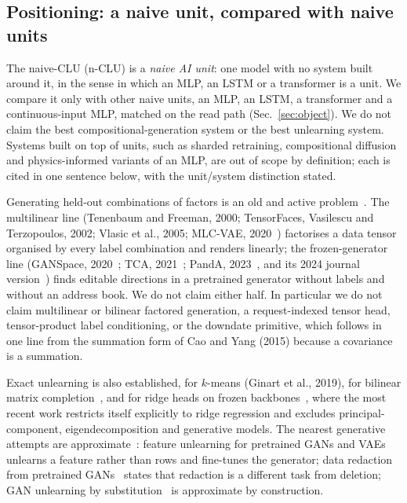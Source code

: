 \documentclass{article} %
\begin{document}
\subsection{Positioning: a naive unit, compared with naive units}
\label{sec:positioning}

The naive-CLU (n-CLU) is a \emph{naive AI unit}: one model with no system built around it, in the sense
in which an MLP, an LSTM or a transformer is a unit. We compare it only with other naive units, an
MLP, an LSTM, a transformer and a continuous-input MLP, matched on the read path
(Sec.~\ref{sec:object}). We do not claim the best compositional-generation system or the best
unlearning system. Systems built on top of units, such as sharded retraining, compositional
diffusion and physics-informed variants of an MLP, are out of scope by definition; each is cited
in one sentence below, with the unit/system distinction stated.

Generating held-out combinations of factors is an old and active problem~\citep{du2020compositional,liu2022compositional}. The multilinear
line (Tenenbaum and Freeman, 2000\nocite{tenenbaum2000separating}; TensorFaces, Vasilescu and Terzopoulos, 2002\nocite{vasilescu2002tensorfaces}; Vlasic et
al., 2005\nocite{vlasic2005face}; MLC-VAE, 2020~\citep{georgopoulos2020multilinear}) factorises a data tensor organised by every label combination and
renders linearly; the frozen-generator line (GANSpace, 2020~\citep{harkonen2020ganspace}; TCA, 2021~\citep{oldfield2021tensor}; PandA, 2023~\citep{oldfield2023panda}, and its
2024 journal version~\citep{oldfield2024bilinear}) finds editable directions in a pretrained generator without labels and
without an address book. We do not claim either half. In particular we do not claim
multilinear or bilinear factored generation, a request-indexed tensor head, tensor-product
label conditioning, or the downdate primitive, which follows in one line from the summation
form of Cao and Yang (2015)\nocite{cao2015towards} because a covariance is a summation.

Exact unlearning is also established, for $k$-means (Ginart et al., 2019\nocite{ginart2019making}), for bilinear
matrix completion~\citep{xu2023netflix}, and for ridge heads on frozen backbones~\citep{quan2026exact}, where the most recent work
restricts itself explicitly to ridge regression and excludes principal-component,
eigendecomposition and generative models. The nearest generative attempts are approximate~\citep{kong2022approximate}:
feature unlearning for pretrained GANs and VAEs~\citep{moon2024feature} unlearns a feature rather than rows and
fine-tunes the generator; data redaction from pretrained GANs~\citep{kong2023data} states that redaction is a
different task from deletion; GAN unlearning by substitution~\citep{sun2025generative} is approximate by construction.
\end{document}
